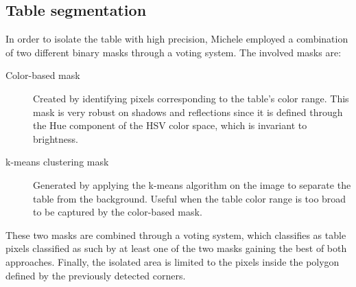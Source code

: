 \subsection{Table segmentation}
In order to isolate the table with high precision, Michele employed a combination of two different binary masks through a voting system.
The involved masks are:
\begin{description}
	\item[Color-based mask] Created by identifying pixels corresponding to the table's color range. This mask is very robust on shadows and reflections since it is defined through the Hue component of the HSV color space, which is invariant to brightness.
	\item[k-means clustering mask] Generated by applying the k-means algorithm on the image to separate the table from the background. Useful when the table color range is too broad to be captured by the color-based mask.
\end{description}
These two masks are combined through a voting system, which classifies as table pixels classified as such by at least one of the two masks gaining the best of both approaches.
Finally, the isolated area is limited to the pixels inside the polygon defined by the previously detected corners.
